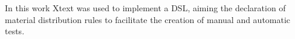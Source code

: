 


In this work Xtext was used to implement a DSL, aiming the declaration of material distribution rules to facilitate the creation of manual and automatic tests.

